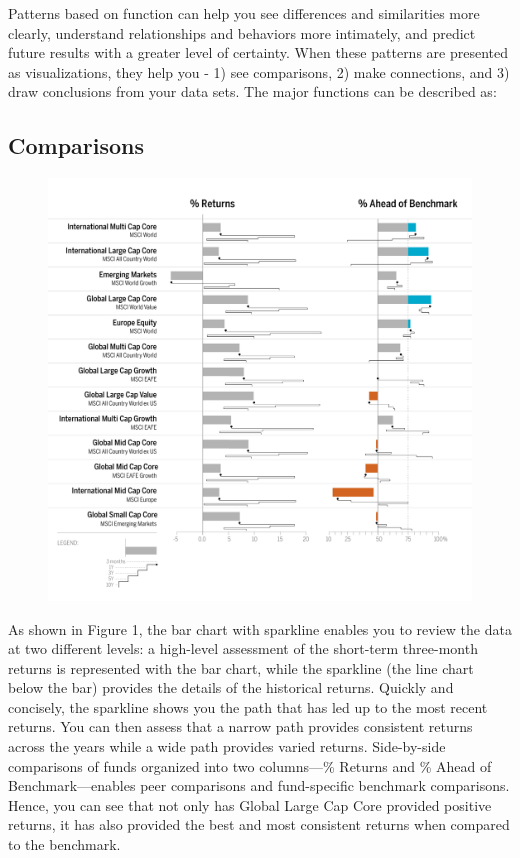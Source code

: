 \documentclass[]{book}
\theoremstyle{definition}
\theoremstyle{definition}
\theoremstyle{definition}
\theoremstyle{remark}
\begin{document}
Patterns based on function can help you see differences and similarities
more clearly, understand relationships and behaviors more intimately,
and predict future results with a greater level of certainty. When these
patterns are presented as visualizations, they help you - 1) see
comparisons, 2) make connections, and 3) draw conclusions from your data
sets. The major functions can be described as:

\subsection{Comparisons}\label{comparisons}

\begin{figure}
\centering
\includegraphics{images/patten-1.jpg}
\caption{}
\end{figure}

As shown in Figure 1, the bar chart with sparkline enables you to review
the data at two different levels: a high-level assessment of the
short-term three-month returns is represented with the bar chart, while
the sparkline (the line chart below the bar) provides the details of the
historical returns. Quickly and concisely, the sparkline shows you the
path that has led up to the most recent returns. You can then assess
that a narrow path provides consistent returns across the years while a
wide path provides varied returns. Side-by-side comparisons of funds
organized into two columns---\% Returns and \% Ahead of
Benchmark---enables peer comparisons and fund-specific benchmark
comparisons. Hence, you can see that not only has Global Large Cap Core
provided positive returns, it has also provided the best and most
consistent returns when compared to the benchmark.
\end{document}
